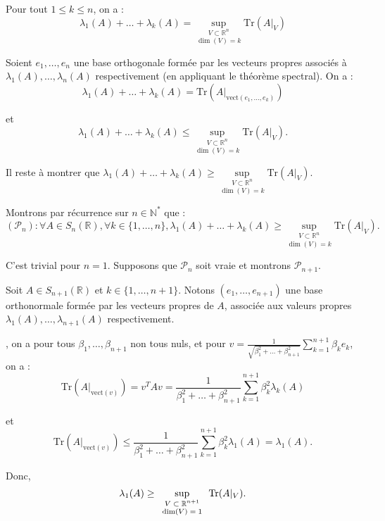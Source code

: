 
Pour tout $1 \leq k \leq n$, on a :
\[ \lambda_1 (A) + \ldots + \lambda_k (A) =   \underset{\dim (V) =
   k}{\underset{V \subset \mathbb{R}^n}{\sup}} \text{Tr} (A|_V) \]



Soient $e_1, \ldots, e_n$ une base orthogonale form{\'e}e par les vecteurs
propres associ{\'e}s {\`a} $\lambda_1 (A), \ldots, \lambda_n (A)$
respectivement (en appliquant le th{\'e}or{\`e}me spectral). On a :
\[ \lambda_1 (A) + \ldots + \lambda_k (A) = \text{Tr} (A|_{\text{vect} (e_1,
   \ldots, e_k)}) \]


et
\[ \lambda_1 (A) + \ldots + \lambda_k (A) \leq \underset{\dim (V) =
   k}{\underset{V \subset \mathbb{R}^n}{\sup}} \text{Tr} (A|_V) . \]


Il reste {\`a} montrer que $\lambda_1 (A) + \ldots + \lambda_k (A) \geq
\underset{\dim (V) = k}{\underset{V \subset \mathbb{R}^n}{\sup}}  \text{Tr}
(A|_V)$.

Montrons par r{\'e}currence sur $n \in \mathbb{N}^{\ast}$ que :
\[ (\mathcal{P}_n) : \forall A \in S_n (\mathbb{R}), \forall k \in \{1,
   \ldots, n\}, \lambda_1 (A) + \ldots + \lambda_k (A) \geq \underset{\dim (V)
   = k}{\underset{V \subset \mathbb{R}^n}{\sup}}  \text{Tr} (A|_V) . \]


C'est trivial pour $n = 1$. Supposons que $\mathcal{P}_n$ soit vraie et
montrons $\mathcal{P}_{n + 1}$.

Soit $A \in S_{n + 1} (\mathbb{R})$ et $k \in \{1, \ldots, n + 1\}$. Notons
$(e_1, \ldots, e_{n + 1})$ une base orthonormale form{\'e}e par les vecteurs
propres de $A$, associ{\'e}e aux valeurs propres $\lambda_1 (A), \ldots,
\lambda_{n + 1} (A)$ respectivement.

, on a pour tous $\beta_1, \ldots, \beta_{n + 1}$ non
tous nuls, et pour $v = \frac{1}{\sqrt{\beta_1^2 + \ldots + \beta_{n + 1}^2}} 
\sum_{k = 1}^{n + 1} \beta_k e_k$, on a :
\[ \text{Tr} (A|_{\text{vect} (v)}) = v^T Av = \frac{1}{\beta_1^2 + \ldots +
   \beta_{n + 1}^2}  \sum_{k = 1}^{n + 1} \beta_k^2 \lambda_k (A) \]


et
\[ \text{Tr} (A|_{\text{vect} (v)}) \leq \frac{1}{\beta_1^2 + \ldots +
   \beta_{n + 1}^2}  \sum_{k = 1}^{n + 1} \beta_k^2 \lambda_1 (A) = \lambda_1
   (A) . \]


Donc,
\[ \lambda_1 (A) \geq \sup_{\text{\scriptsize{$\begin{array}{c}
     V \subset \mathbb{R}^{n + 1}\\
     \dim (V) = 1
   \end{array}$}}}  \text{Tr} (A|_V) . \]


